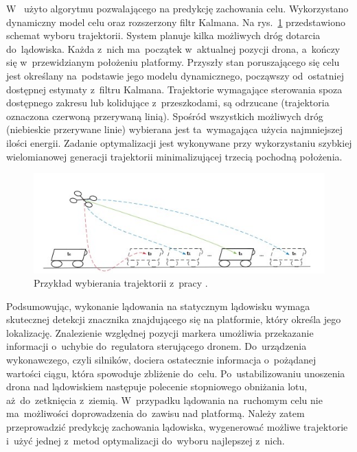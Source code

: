 W~\cite{Falanga} użyto algorytmu pozwalającego na predykcję zachowania celu. 
Wykorzystano dynamiczny model celu oraz rozszerzony filtr Kalmana. 
Na rys.~\ref{fig:trajektorie} przedstawiono schemat wyboru trajektorii. 
System planuje kilka możliwych dróg dotarcia do~lądowiska. 
Każda z~nich ma~początek w~aktualnej pozycji drona, a~kończy się w~przewidzianym położeniu platformy. 
Przyszły stan poruszającego się celu jest określany na~podstawie jego modelu dynamicznego, począwszy od~ostatniej dostępnej estymaty z~filtru Kalmana. 
Trajektorie wymagające sterowania spoza dostępnego zakresu lub kolidujące z~przeszkodami, są odrzucane (trajektoria oznaczona czerwoną przerywaną linią). 
Spośród wszystkich możliwych dróg (niebieskie przerywane linie) wybierana jest ta~wymagająca użycia najmniejszej ilości energii. 
Zadanie optymalizacji jest wykonywane przy wykorzystaniu szybkiej wielomianowej generacji trajektorii minimalizującej trzecią pochodną położenia.
\begin{figure}[h]
	\centering
	\includegraphics[width=\textwidth]{trajektorie.jpg}
	\caption{Przykład wybierania trajektorii z~pracy \cite{Falanga}.}
	\label{fig:trajektorie}
\end{figure}


Podsumowując, wykonanie lądowania na statycznym lądowisku wymaga skutecznej detekcji znacznika znajdującego się na platformie, który określa jego lokalizację. 
Znalezienie względnej pozycji markera umożliwia przekazanie informacji o~uchybie do~regulatora sterującego dronem. 
Do~urządzenia wykonawczego, czyli silników, dociera ostatecznie informacja o~pożądanej wartości ciągu, która spowoduje zbliżenie do~celu. 
Po~ustabilizowaniu unoszenia drona nad lądowiskiem następuje polecenie stopniowego obniżania lotu, aż~do~zetknięcia z~ziemią.
W~przypadku lądowania na~ruchomym celu nie ma~możliwości doprowadzenia do~zawisu nad platformą. 
Należy zatem przeprowadzić predykcję zachowania lądowiska, wygenerować możliwe trajektorie i~użyć jednej z~metod optymalizacji do~wyboru najlepszej z~nich.

